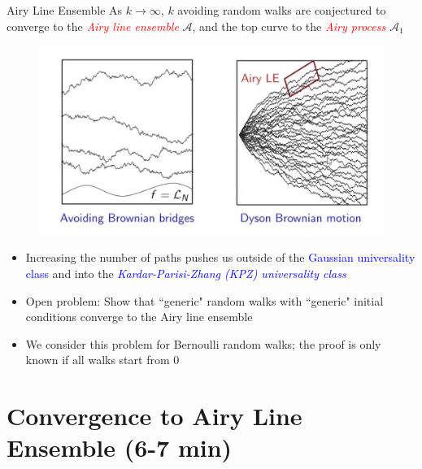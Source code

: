 \documentclass[9pt,t,dvipsnames]{beamer}
\begin{document}
\begin{frame}{Airy Line Ensemble}
As $k \to \infty$, $k$ avoiding random walks are conjectured to converge to the \textit{\textcolor{red}{Airy line ensemble}} $\mathcal{A}$, and the top curve to the \textit{\textcolor{red}{Airy process}} $\mathcal{A}_1$
\begin{figure}
	\includegraphics[height=0.45\textheight]{graphics/airy.png}
\end{figure}

\begin{itemize}
	
	\item Increasing the number of paths pushes us outside of the \textcolor{blue}{Gaussian universality class} and into the \textcolor{blue}{\textit{Kardar-Parisi-Zhang (KPZ) universality class}}
	
	\item Open problem: Show that ``generic" random walks with ``generic" initial conditions converge to the Airy line ensemble
	
	\item We consider this problem for Bernoulli random walks; the proof is only known if all walks start from 0
	
\end{itemize}
\end{frame}


\section{Convergence to Airy Line Ensemble (6-7 min)}
\end{document}
